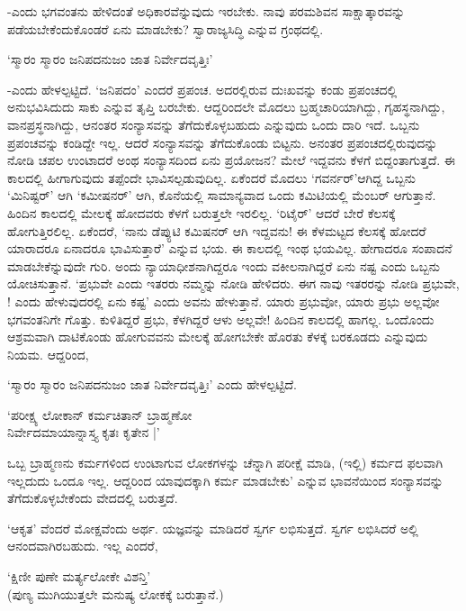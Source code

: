 -ಎಂದು ಭಗವಂತನು ಹೇಳಿದಂತೆ ಅಧಿಕಾರವೆನ್ನುವುದು ಇರಬೇಕು. ನಾವು ಪರಮಶಿವನ ಸಾಕ್ಷಾತ್ಕಾರವನ್ನು ಪಡೆಯಬೇಕೆಂದುಕೊಂಡರೆ ಏನು ಮಾಡಬೇಕು? ಸ್ವಾರಾಜ್ಯಸಿದ್ಧಿ ಎನ್ನುವ ಗ್ರಂಥದಲ್ಲಿ.

\begin{shloka}
`ಸ್ಮಾರಂ ಸ್ಮಾರಂ ಜನಿಪದನುಜಂ ಜಾತ ನಿರ್ವೇದವೃತ್ತಿಃ'
\end{shloka}

-ಎಂದು ಹೇಳಲ್ಪಟ್ಟಿದೆ. `ಜನಿಪದಂ' ಎಂದರೆ ಪ್ರಪಂಚ. ಅದರಲ್ಲಿರುವ ದುಃಖವನ್ನು ಕಂಡು ಪ್ರಪಂಚದಲ್ಲಿ ಅನುಭವಿಸಿದುದು ಸಾಕು ಎನ್ನುವ ತೃಪ್ತಿ ಬರಬೇಕು. ಆದ್ದರಿಂದಲೇ ಮೊದಲು ಬ್ರಹ್ಮಚಾರಿಯಾಗಿದ್ದು, ಗೃಹಸ್ಥನಾಗಿದ್ದು, ವಾನಪ್ರಸ್ಥನಾಗಿದ್ದು, ಆನಂತರ ಸಂನ್ಯಾಸವನ್ನು ತೆಗೆದುಕೊಳ್ಳಬಹುದು ಎನ್ನುವುದು ಒಂದು ದಾರಿ ಇದೆ. ಒಬ್ಬನು ಪ್ರಪಂಚವನ್ನು ಕಂಡಿದ್ದೇ ಇಲ್ಲ. ಆದರೆ ಸಂನ್ಯಾಸವನ್ನು ತೆಗೆದುಕೊಂಡು ಬಿಟ್ಟನು. ಅನಂತರ ಪ್ರಪಂಚದಲ್ಲಿರುವುದನ್ನು ನೋಡಿ ಚಪಲ ಉಂಟಾದರೆ ಅಂಥ ಸಂನ್ಯಾಸದಿಂದ ಏನು ಪ್ರಯೋಜನ? ಮೇಲೆ ಇದ್ದವನು ಕೆಳಗೆ ಬಿದ್ದಂತಾಗುತ್ತದೆ. ಈ ಕಾಲದಲ್ಲಿ ಹೀಗಾಗುವುದು ತಪ್ಪೆಂದೇ ಭಾವಿಸಲ್ಪಡುವುದಿಲ್ಲ. ಏಕೆಂದರೆ ಮೊದಲು `ಗವರ್ನರ್'ಆಗಿದ್ದ ಒಬ್ಬನು `ಮಿನಿಷ್ಟರ್' ಆಗಿ `ಕಮೀಷನರ್' ಆಗಿ, ಕೊನೆಯಲ್ಲಿ ಸಾಮಾನ್ಯವಾದ ಒಂದು ಕಮಿಟಿಯಲ್ಲಿ ಮೆಂಬರ್ ಆಗುತ್ತಾನೆ. ಹಿಂದಿನ ಕಾಲದಲ್ಲಿ ಮೇಲಕ್ಕೆ ಹೋದವರು ಕೆಳಗೆ ಬರುತ್ತಲೇ ಇರಲಿಲ್ಲ. `ರಿಟೈರ್' ಆದರೆ ಬೇರೆ ಕೆಲಸಕ್ಕೆ ಹೋಗುತ್ತಿರಲಿಲ್ಲ. ಏಕೆಂದರೆ, `ನಾನು ಡೆಪ್ಯುಟಿ ಕಮಿಷನರ್ ಆಗಿ ಇದ್ದವನು! ಈ ಕೆಳಮಟ್ಟದ ಕೆಲಸಕ್ಕೆ ಹೋದರೆ ಯಾರಾದರೂ ಏನಾದರೂ ಭಾವಿಸುತ್ತಾರೆ' ಎನ್ನುವ ಭಯ. ಈ ಕಾಲದಲ್ಲಿ ಇಂಥ ಭಯವಿಲ್ಲ. ಹೇಗಾದರೂ ಸಂಪಾದನೆ ಮಾಡಬೇಕೆನ್ನುವುದೇ ಗುರಿ. ಅಂದು ನ್ಯಾಯಾಧೀಶನಾಗಿದ್ದರೂ ಇಂದು ವಕೀಲನಾಗಿದ್ದರೆ ಏನು ನಷ್ಟ ಎಂದು ಒಬ್ಬನು ಯೋಚಿಸುತ್ತಾನೆ. `ಪ್ರಭುವೇ ಎಂದು ಇತರರು ನಮ್ಮನ್ನು ನೋಡಿ ಹೇಳಿದರು. ಈಗ ನಾವು ಇತರರನ್ನು ನೋಡಿ ಪ್ರಭುವೇ, ! ಎಂದು ಹೇಳುವುದರಲ್ಲಿ ಏನು ಕಷ್ಟ' ಎಂದು ಅವನು ಹೇಳುತ್ತಾನೆ. ಯಾರು ಪ್ರಭುವೋ, ಯಾರು ಪ್ರಭು ಅಲ್ಲವೋ ಭಗವಂತನಿಗೇ ಗೊತ್ತು. ಕುಳಿತಿದ್ದರೆ ಪ್ರಭು, ಕೆಳಗಿದ್ದರೆ ಆಳು ಅಲ್ಲವೇ! ಹಿಂದಿನ ಕಾಲದಲ್ಲಿ ಹಾಗಲ್ಲ. ಒಂದೊಂದು ಆಶ್ರಮವಾಗಿ ದಾಟಿಕೊಂಡು ಹೋಗುವವನು ಮೇಲಕ್ಕೆ ಹೋಗಬೇಕೇ ಹೊರತು ಕೆಳಕ್ಕೆ ಬರಕೂಡದು ಎನ್ನುವುದು ನಿಯಮ. ಆದ್ದರಿಂದ, 

`ಸ್ಮಾರಂ ಸ್ಮಾರಂ ಜನಿಪದನುಜಂ ಜಾತ ನಿರ್ವೇದವೃತ್ತಿಃ' ಎಂದು ಹೇಳಲ್ಪಟ್ಟಿದೆ.

\begin{shloka}
`ಪರೀಕ್ಷ್ಯ ಲೋಕಾನ್ ಕರ್ಮಚಿತಾನ್ ಬ್ರಾಹ್ಮಣೋ\\
ನಿರ್ವೇದಮಾಯಾನ್ನಾಸ್ತ್ಯ ಕೃತಃ ಕೃತೇನ |'
\end{shloka}

ಒಬ್ಬ ಬ್ರಾಹ್ಮಣನು ಕರ್ಮಗಳಿಂದ ಉಂಟಾಗುವ ಲೋಕಗಳನ್ನು ಚೆನ್ನಾಗಿ ಪರೀಕ್ಷೆ ಮಾಡಿ, (ಇಲ್ಲಿ) ಕರ್ಮದ ಫಲವಾಗಿ ಇಲ್ಲದುದು ಒಂದೂ ಇಲ್ಲ. ಆದ್ದರಿಂದ ಯಾವುದಕ್ಕಾಗಿ ಕರ್ಮ ಮಾಡಬೇಕು' ಎನ್ನುವ ಭಾವನೆಯಿಂದ ಸಂನ್ಯಾಸವನ್ನು ತೆಗೆದುಕೊಳ್ಳಬೇಕೆಂದು ವೇದದಲ್ಲಿ ಬರುತ್ತದೆ.

`ಆಕೃತ' ವೆಂದರೆ ಮೋಕ್ಷವೆಂದು ಅರ್ಥ. ಯಜ್ಞವನ್ನು ಮಾಡಿದರೆ ಸ್ವರ್ಗ ಲಭಿಸುತ್ತದೆ. ಸ್ವರ್ಗ ಲಭಿಸಿದರೆ ಅಲ್ಲಿ ಆನಂದವಾಗಿರಬಹುದು. ಇಲ್ಲ ಎಂದರೆ,

\begin{shloka}
`ಕ್ಷಿಣೀ ಪುಣೇ ಮರ್ತ್ಯಲೋಕೇ ವಿಶನ್ತಿ'\\
(ಪುಣ್ಯ ಮುಗಿಯುತ್ತಲೇ ಮನುಷ್ಯ ಲೋಕಕ್ಕೆ ಬರುತ್ತಾನೆ.)
\end{shloka}

